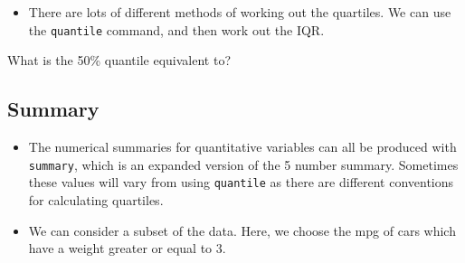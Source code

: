 \documentclass[]{article}
\newenvironment{Shaded}{\begin{snugshade}}{\end{snugshade}}
\newcommand{\CommentTok}[1]{\textcolor[rgb]{0.56,0.35,0.01}{\textit{#1}}}
\newcommand{\DecValTok}[1]{\textcolor[rgb]{0.00,0.00,0.81}{#1}}
\newcommand{\KeywordTok}[1]{\textcolor[rgb]{0.13,0.29,0.53}{\textbf{#1}}}
\newcommand{\NormalTok}[1]{#1}
\newcommand{\OperatorTok}[1]{\textcolor[rgb]{0.81,0.36,0.00}{\textbf{#1}}}
\providecommand{\tightlist}{%
  \setlength{\itemsep}{0pt}\setlength{\parskip}{0pt}}
\begin{document}
\begin{itemize}
\tightlist
\item
  There are lots of different methods of working out the quartiles. We can use the \texttt{quantile} command, and then work out the IQR.
\end{itemize}

\begin{Shaded}
\end{Shaded}

What is the 50\% quantile equivalent to?

\hypertarget{summary}{%
\subsection{Summary}\label{summary}}

\begin{itemize}
\tightlist
\item
  The numerical summaries for quantitative variables can all be produced with \texttt{summary}, which is an expanded version of the 5 number summary. Sometimes these values will vary from using \texttt{quantile} as there are different conventions for calculating quartiles.
\end{itemize}

\begin{Shaded}
\end{Shaded}

\begin{itemize}
\tightlist
\item
  We can consider a subset of the data.
  Here, we choose the mpg of cars which have a weight greater or equal to 3.
\end{itemize}

\begin{Shaded}
\end{Shaded}
\end{document}
